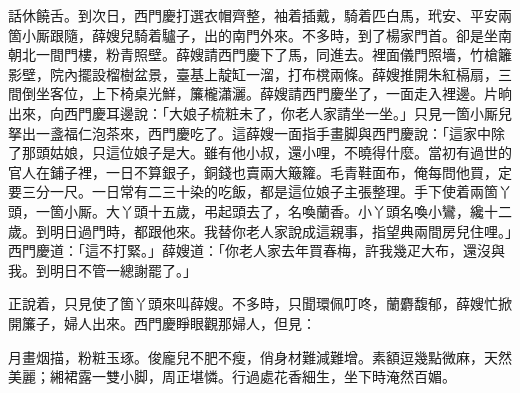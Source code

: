 話休饒舌。到次日，西門慶打選衣帽齊整，袖着插戴，騎着匹白馬，玳安、平安兩箇小厮跟隨，薛嫂兒騎着驢子，出的南門外來。不多時，到了楊家門首。卻是坐南朝北一間門樓，粉青照壁。薛嫂請西門慶下了馬，同進去。裡面儀門照墻，竹槍籬影壁，院內擺設榴樹盆景，臺基上靛缸一溜，打布櫈兩條。{}薛嫂推開朱紅槅扇，三間倒坐客位，上下椅桌光鮮，簾櫳瀟灑。薛嫂請西門慶坐了，一面走入裡邊。片晌出來，向西門慶耳邊說：「大娘子梳粧未了，你老人家請坐一坐。」只見一箇小厮兒拏出一盞福仁泡茶來，西門慶吃了。這薛嫂一面指手畫脚與西門慶說：「這家中除了那頭姑娘，只這位娘子是大。雖有他小叔，還小哩，不曉得什麼。當初有過世的官人在鋪子裡，一日不算銀子，銅錢也賣兩大簸籮。毛青鞋面布，{}俺每問他買，定要三分一尺。一日常有二三十染的吃飯，都是這位娘子主張整理。{}手下使着兩箇丫頭，一箇小厮。大丫頭十五歲，弔起頭去了，名喚蘭香。小丫頭名喚小鸞，纔十二歲。到明日過門時，都跟他來。我替你老人家說成這親事，指望典兩間房兒住哩。」西門慶道：「這不打緊。」薛嫂道：「你老人家去年買春梅，{}許我幾疋大布，還沒與我。到明日不管一總謝罷了。」

正說着，只見使了箇丫頭來叫薛嫂。不多時，只聞環佩叮咚，蘭麝馥郁，薛嫂忙掀開簾子，婦人出來。西門慶睜眼觀那婦人，但見：

\begin{myquote} 
月畫烟描，粉粧玉琢。俊龐兒不肥不瘦，俏身材難減難增。素額逗幾點微麻，天然美麗；緗裙露一雙小脚，周正堪憐。行過處花香細生，坐下時淹然百媚。
\end{myquote} 

